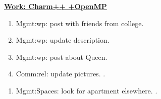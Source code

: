 {\begin{multicols}{4}
\begin{minipage}{\columnwidth} 
\underline{\bf \tiny {Work: Charm++ +OpenMP}}
\begin{enumerate}
\item \tiny Mgmt:wp: post with friends from college. 
\item \tiny Mgmt:wp: update description. 
\item \tiny Mgmt:wp: post about Queen.   
\item \tiny Comm:rel: update pictures. .
\end{enumerate}
\end{minipage}

\begin{minipage}{\columnwidth}
\begin{enumerate} 
 \item \tiny Mgmt:Spaces: look for apartment elsewhere. . 
\end{enumerate}
\end{minipage} 
\end{multicols}

} 


